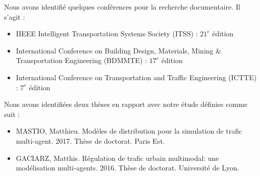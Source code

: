 Nous avons identifié quelques conférences pour la recherche documentaire. Il s'agit :
\begin{itemize}
    \item IIEEE Intelligent Transportation Systems Society (ITSS) : $21^e$ édition
    \item International Conference on Building Design, Materials, Mining \& Transportation Engineering (BDMMTE) : $17^e$ édition
    \item International Conference on Transportation and Traffic Engineering (ICTTE) : $7^e$ édition
\end{itemize}

Nous avons identifiées deux thèses en rapport avec notre étude définies comme suit :
\begin{itemize}
    \item MASTIO, Matthieu. Modèles de distribution pour la simulation de trafic multi-agent. 2017. Thèse de doctorat. Paris Est.
    \item GACIARZ, Matthis. Régulation de trafic urbain multimodal: une modélisation multi-agents. 2016. Thèse de doctorat. Université de Lyon.
\end{itemize}
